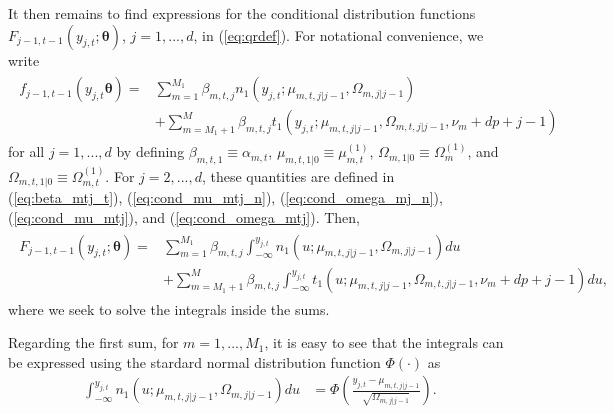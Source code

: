 \documentclass[nojss]{jss} %
\begin{document}
\begin{appendix}
It then remains to find expressions for the conditional distribution functions $F_{j-1,t-1}(y_{j,t};\boldsymbol{\theta})$, $j=1,...,d$, in (\ref{eq:qrdef}).  For notational convenience, we write
\begin{align}
\begin{aligned}
f_{j-1,t-1}(y_{j,t}\boldsymbol{\theta}) =& \sum_{m=1}^{M_1}\beta_{m,t,j}n_1(y_{j,t};\mu_{m,t,j|j-1},\Omega_{m,j|j-1}) \\
&+ \sum_{m=M_1 + 1}^{M}\beta_{m,t,j}t_1(y_{j,t};\mu_{m,t,j|j-1},\Omega_{m,t,j|j-1},\nu_m + dp + j - 1)
\end{aligned}
\end{align}
for all $j=1,...,d$ by defining $\beta_{m,t,1}\equiv \alpha_{m,t}$,  $\mu_{m,t,1|0}\equiv \mu_{m,t}^{(1)}$,  $\Omega_{m,1|0}\equiv \Omega_{m}^{(1)}$, and $\Omega_{m,t,1|0}\equiv \Omega_{m,t}^{(1)}$.  For $j=2,...,d$,  these quantities are defined in (\ref{eq:beta_mtj_t}), (\ref{eq:cond_mu_mtj_n}), (\ref{eq:cond_omega_mj_n}), (\ref{eq:cond_mu_mtj}), and (\ref{eq:cond_omega_mtj}). Then,
\begin{align}
\begin{aligned}
F_{j-1,t-1}(y_{j,t};\boldsymbol{\theta})=&\sum_{m=1}^{M_1}\beta_{m,t,j}\int_{-\infty}^{y_{j,t}}n_1(u;\mu_{m,t,j|j-1},\Omega_{m,j|j-1})du \\
&+\sum_{m=M_1+1}^{M}\beta_{m,t,j}\int_{-\infty}^{y_{j,t}}t_1(u;\mu_{m,t,j|j-1},\Omega_{m,t,j|j-1},\nu_m + dp + j - 1)du,
\end{aligned}
\end{align}
where we seek to solve the integrals inside the sums.

Regarding the first sum,  for $m=1,...,M_1$,  it is easy to see that the integrals can be expressed using the stardard normal distribution function $\Phi(\cdot)$ as
\begin{align}
\int_{-\infty}^{y_{j,t}}n_1(u;\mu_{m,t,j|j-1},\Omega_{m,j|j-1})du &= \Phi\left(\frac{y_{j,t}-\mu_{m,t,j|j-1}}{\sqrt{\Omega_{m,j|j-1}}}\right).
\end{align}


\end{appendix}
\end{document}
